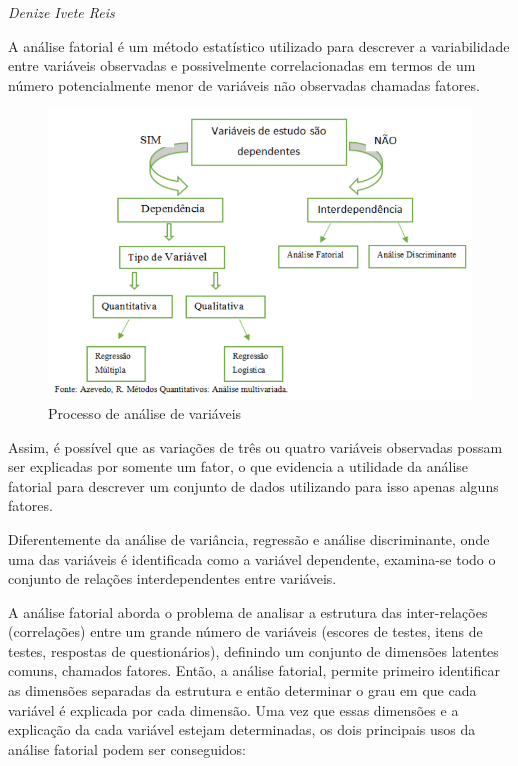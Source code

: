 \documentclass[12pt,brazil,oneside]{book}
\begin{document}
\emph{Denize Ivete Reis}

\begin{flushright}
\emph{}
\end{flushright}

A análise fatorial é um método estatístico utilizado para descrever a variabilidade entre variáveis observadas e possivelmente correlacionadas em termos de um número potencialmente menor de variáveis não observadas chamadas fatores.

\begin{figure}[H]

{\centering \includegraphics[width=0.8\linewidth]{anfat1} 

}

\caption{Processo de análise de variáveis}\label{fig:unnamed-chunk-26}
\end{figure}

Assim, é possível que as variações de três ou quatro variáveis observadas possam ser explicadas por somente um fator, o que evidencia a utilidade da análise fatorial para descrever um conjunto de dados utilizando para isso apenas alguns fatores.

Diferentemente da análise de variância, regressão e análise discriminante, onde uma das variáveis é identificada como a variável dependente, examina-se todo o conjunto de relações interdependentes entre variáveis.

A análise fatorial aborda o problema de analisar a estrutura das inter-relações (correlações) entre um grande número de variáveis (escores de testes, itens de testes, respostas de questionários), definindo um conjunto de dimensões latentes comuns, chamados fatores. Então, a análise fatorial, permite primeiro identificar as dimensões separadas da estrutura e então determinar o grau em que cada variável é explicada por cada dimensão. Uma vez que essas dimensões e a explicação da cada variável estejam determinadas, os dois principais usos da análise fatorial podem ser conseguidos:
\end{document}
